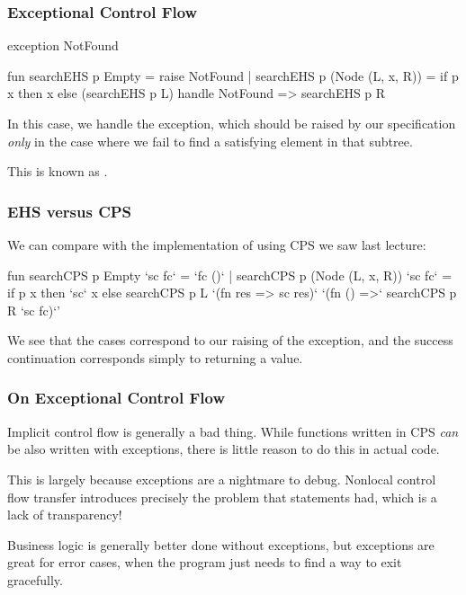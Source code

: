 \documentclass[aspectratio=169, handout]{beamer}
\begin{document}
\begin{frame}[fragile]
  \frametitle{Exceptional Control Flow}
  \begin{codeblock}
    exception NotFound

    fun searchEHS p Empty = raise NotFound
      | searchEHS p (Node (L, x, R)) =
          if p x then
            x
          else
            (searchEHS p L) handle NotFound => searchEHS p R
  \end{codeblock}

  \pause
  \vspace{\fill}

  In this case, we handle the  exception, which should be raised
  by our specification \textit{only} in the case where we fail to find a
  satisfying element in that subtree.

  \pause
  \vspace{\fill}

  This is known as .
\end{frame}

\begin{frame}[fragile]
  \frametitle{EHS versus CPS}

  We can compare with the implementation of  using CPS we saw last lecture:

  \vspace{\fill}

  \begin{codeblock}
    fun searchCPS p Empty `sc fc` = `fc ()`
      | searchCPS p (Node (L, x, R)) `sc fc` =
          if p x then
            `sc` x
          else
            searchCPS p L
              `(fn res => sc res)`
              `(fn () =>` searchCPS p R `sc fc)`'
  \end{codeblock}

  \pause
  \vspace{\fill}

  We see that the  cases correspond to our raising of the  exception,
  and the success continuation corresponds simply to returning a value.

\end{frame}

\begin{frame}[fragile]
  \frametitle{On Exceptional Control Flow}

  Implicit control flow is generally a bad thing. While functions written in
  CPS \textit{can} be also written with exceptions, there is little reason to
  do this in actual code.

  \pause
  \vspace{\fill}

  This is largely because exceptions are a nightmare to debug. Nonlocal control
  flow transfer introduces precisely the problem that  statements
  had, which is a lack of transparency!

  \pause
  \vspace{\fill}

  Business logic is generally better done without exceptions, but exceptions are
  great for error cases, when the program just needs to find a way to exit
  gracefully.
\end{frame}
\end{document}
